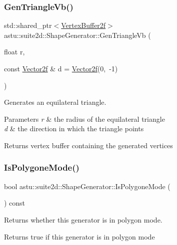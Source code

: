 \subsubsection{\texorpdfstring{Gen\+Triangle\+Vb()}{GenTriangleVb()}}
{\footnotesize\ttfamily std\+::shared\+\_\+ptr$<$\hyperlink{group__gfx__group_ga081cf45a441eef100dfbb1e0f64c3826}{Vertex\+Buffer2f}$>$ astu\+::suite2d\+::\+Shape\+Generator\+::\+Gen\+Triangle\+Vb (\begin{DoxyParamCaption}\item[{float}]{r,  }\item[{const \hyperlink{classastu_1_1Vector2}{Vector2f} \&}]{d = {\ttfamily \hyperlink{classastu_1_1Vector2}{Vector2f}(0,~-\/1)} }\end{DoxyParamCaption})\hspace{0.3cm}{\ttfamily [inline]}}

Generates an equilateral triangle.


\begin{DoxyParams}{Parameters}
{\em r} & the radius of the equilateral triangle \\
\hline
{\em d} & the direction in which the triangle points \\
\hline
\end{DoxyParams}
\begin{DoxyReturn}{Returns}
vertex buffer containing the generated vertices 
\end{DoxyReturn}
\mbox{\label{classastu_1_1suite2d_1_1ShapeGenerator_a3cb3a9b392451d077d1c670347bb4b93}} 
\subsubsection{\texorpdfstring{Is\+Polygone\+Mode()}{IsPolygoneMode()}}
{\footnotesize\ttfamily bool astu\+::suite2d\+::\+Shape\+Generator\+::\+Is\+Polygone\+Mode (\begin{DoxyParamCaption}{ }\end{DoxyParamCaption}) const\hspace{0.3cm}{\ttfamily [inline]}}

Returns whether this generator is in polygon mode.

\begin{DoxyReturn}{Returns}
{\ttfamily true} if this generator is in polygon mode 
\end{DoxyReturn}
\mbox{\label{classastu_1_1suite2d_1_1ShapeGenerator_a6dd93b603ec632e6ff800bc1fcd223a9}} 
